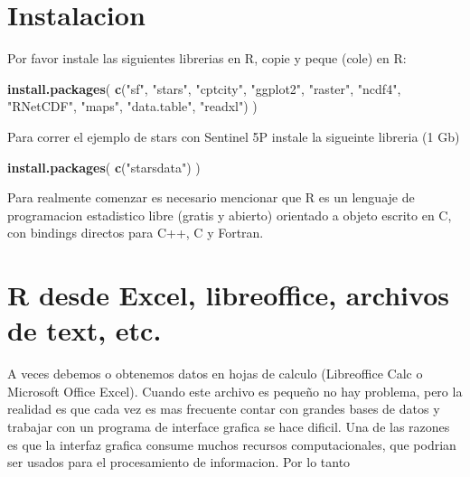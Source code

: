 \documentclass[]{book}
\newenvironment{Shaded}{\begin{snugshade}}{\end{snugshade}}
\newcommand{\KeywordTok}[1]{\textcolor[rgb]{0.13,0.29,0.53}{\textbf{#1}}}
\newcommand{\NormalTok}[1]{#1}
\newcommand{\StringTok}[1]{\textcolor[rgb]{0.31,0.60,0.02}{#1}}
\begin{document}
\hypertarget{instalacion}{%
\section{Instalacion}\label{instalacion}}

Por favor instale las siguientes librerias en R, copie y peque (cole) en R:

\begin{Shaded}
\begin{Highlighting}[]
\KeywordTok{install.packages}\NormalTok{(}
  \KeywordTok{c}\NormalTok{(}\StringTok{"sf"}\NormalTok{, }\StringTok{"stars"}\NormalTok{, }\StringTok{"cptcity"}\NormalTok{, }\StringTok{"ggplot2"}\NormalTok{, }\StringTok{"raster"}\NormalTok{, }\StringTok{"ncdf4"}\NormalTok{, }
    \StringTok{"RNetCDF"}\NormalTok{, }\StringTok{"maps"}\NormalTok{, }\StringTok{"data.table"}\NormalTok{, }\StringTok{"readxl"}\NormalTok{)}
\NormalTok{)}
\end{Highlighting}
\end{Shaded}

Para correr el ejemplo de stars con Sentinel 5P instale la sigueinte libreria (1 Gb)

\begin{Shaded}
\begin{Highlighting}[]
\KeywordTok{install.packages}\NormalTok{(}
  \KeywordTok{c}\NormalTok{(}\StringTok{"starsdata"}\NormalTok{)}
\NormalTok{)}
\end{Highlighting}
\end{Shaded}

Para realmente comenzar es necesario mencionar que R es un lenguaje de programacion estadistico libre (gratis y abierto) orientado a objeto escrito en C, con bindings directos para C++, C y Fortran.

\hypertarget{r-desde-excel-libreoffice-archivos-de-text-etc.}{%
\section{R desde Excel, libreoffice, archivos de text, etc.}\label{r-desde-excel-libreoffice-archivos-de-text-etc.}}

A veces debemos o obtenemos datos en hojas de calculo (Libreoffice Calc o Microsoft Office Excel). Cuando este archivo es pequeño no hay problema, pero la realidad es que cada vez es mas frecuente contar con grandes bases de datos y trabajar con un programa de interface grafica se hace dificil. Una de las razones es que la interfaz grafica consume muchos recursos computacionales, que podrian ser usados para el procesamiento de informacion. Por lo tanto
\end{document}
